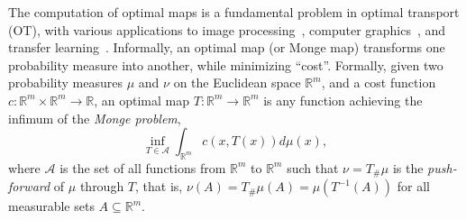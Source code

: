 \documentclass[runningheads]{llncs}
\begin{document}



The computation of optimal maps is a fundamental problem in optimal transport (OT), with various applications to image processing~\citep{gramfort2015fast}, 
computer graphics~\citep{solomon2015convolutional}, and
transfer learning~\citep{courty2017optimal}.
Informally, an optimal map (or Monge map) transforms one probability measure into another, while minimizing ``cost''. Formally, given two probability measures $\mu$ and $\nu$ on the Euclidean space $\mathds{R}^m$, and a cost function $c :\mathds{R}^m\times \mathds{R}^m\rightarrow \mathds{R}$, an optimal map $T : \mathds{R}^m \to \mathds{R}^m$ is any function achieving the infimum of the \emph{Monge problem},
\begin{equation} \label{MONGE_PROBLEM}
 \inf_{T \in \mathcal{A}} \int_{\mathds{R}^m} c(x,T(x)) d\mu(x),
\end{equation}
where $\mathcal{A}$ is the set of all functions from $\mathds{R}^m$ to $\mathds{R}^m$ such that $\nu = T_\#\mu$ is the \emph{push-forward} of $\mu$ through $T$, that is, $\nu(A) = T_\#\mu(A) = \mu(T^{-1}(A))$ for all measurable sets $A \subseteq \mathds{R}^m$.
\end{document}
